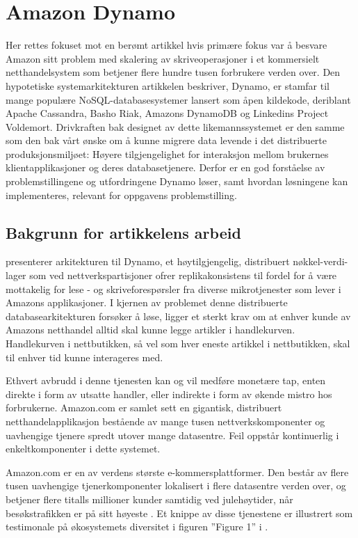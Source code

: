 \section{Amazon Dynamo}

Her rettes fokuset mot en berømt artikkel hvis primære fokus var å besvare Amazon sitt problem med skalering av skriveoperasjoner i et kommersielt netthandelsystem som betjener flere hundre tusen forbrukere verden over. Den hypotetiske systemarkitekturen artikkelen beskriver, Dynamo, er stamfar til mange populære NoSQL-databasesystemer lansert som åpen kildekode, deriblant Apache Cassandra, Basho Riak, Amazons DynamoDB og Linkedins Project Voldemort. Drivkraften bak designet av dette likemannssystemet er den samme som den bak vårt ønske om å kunne migrere data levende i det distribuerte produksjonsmiljøet: Høyere tilgjengelighet for interaksjon mellom brukernes klientapplikasjoner og deres databasetjenere. Derfor er en god forståelse av problemstillingene og utfordringene Dynamo løser, samt hvordan løsningene kan implementeres, relevant for oppgavens problemstilling.

\subsection{Bakgrunn for artikkelens arbeid}

\cite{decandia2007} presenterer arkitekturen til Dynamo, et høytilgjengelig, distribuert nøkkel-verdi-lager som ved nettverkspartisjoner ofrer replikakonsistens til fordel for å være mottakelig for lese - og skriveforespørsler fra diverse mikrotjenester som lever i Amazons applikasjoner. I kjernen av problemet denne distribuerte databasearkitekturen forsøker å løse, ligger et sterkt krav om at enhver kunde av Amazons netthandel alltid skal kunne legge artikler i handlekurven. Handlekurven i nettbutikken, så vel som hver eneste artikkel i nettbutikken, skal til enhver tid kunne interageres med. 

Ethvert avbrudd i denne tjenesten kan og vil medføre monetære tap, enten direkte i form av utsatte handler, eller indirekte i form av økende mistro hos forbrukerne. Amazon.com er samlet sett en gigantisk, distribuert netthandelapplikasjon bestående av mange tusen nettverkskomponenter og uavhengige tjenere spredt utover mange datasentre. Feil oppstår kontinuerlig i enkeltkomponenter i dette systemet.

Amazon.com er en av verdens største e-kommersplattformer. Den består av flere tusen uavhengige tjenerkomponenter lokalisert i flere datasentre verden over, og betjener flere titalls millioner kunder samtidig ved julehøytider, når besøkstrafikken er på sitt høyeste \citep{pepitone2010}. Et knippe av disse tjenestene er illustrert som testimonale på økosystemets diversitet i figuren ''Figure 1'' i \citep{decandia2007}.

